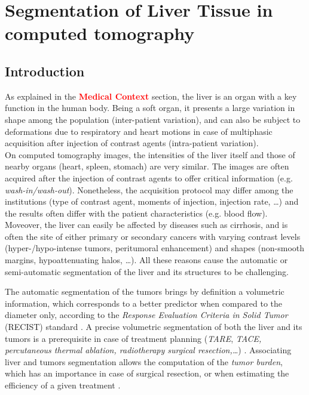 \documentclass[]{article}
\begin{document}
	
	\section*{Segmentation of Liver Tissue in computed tomography}
	
	\subsection*{Introduction}
	
	As explained in the \textbf{\textcolor{red}{Medical Context}} section, the liver is an
	organ with a key function in the human body. Being a soft organ, it
	presents a large variation in shape among the population (inter-patient
	variation), and can also be subject to deformations due to respiratory
	and heart motions in case of multiphasic acquisition after injection of
	contrast agents (intra-patient variation).\\
	On computed tomography images, the intensities of the liver itself and
	those of nearby organs (heart, spleen, stomach) are very similar. The
	images are often acquired after the injection of contrast agents to
	offer critical information (e.g. \emph{wash-in/wash-out}). Nonetheless,
	the acquisition protocol may differ among the institutions (type of
	contrast agent, moments of injection, injection rate, \ldots{}) and the
	results often differ with the patient characteristics (e.g. blood flow).
	Moveover, the liver can easily be affected by diseases such as
	cirrhosis, and is often the site of either primary or secondary cancers
	with varying contrast levels (hyper-/hypo-intense tumors, peritumoral
	enhancement) and shapes (non-smooth margins, hypoattenuating halos,
	\ldots{}). All these reasons cause the automatic or semi-automatic
	segmentation of the liver and its structures to be challenging.
	
	The automatic segmentation of the tumors brings by definition a
	volumetric information, which corresponds to a better predictor when
	compared to the diameter only, according to the \emph{Response
		Evaluation Criteria in Solid Tumor} (RECIST) standard \cite{Eisenhauer2008, Ye2017}. A precise
	volumetric segmentation of both the liver and its tumors is a
	prerequisite in case of treatment planning (\emph{TARE}, \emph{TACE,
		percutaneous thermal ablation, radiotherapy surgical resection,\ldots{}}) \cite{Al-Nahhas2014, Yamada1983, Albain2009, Rossi96}. Associating liver and tumors
	segmentation allows the computation of the \emph{tumor burden}, which
	has an importance in case of surgical resection, or when estimating the
	efficiency of a given treatment \cite{Nordlinger1996, Jagannath1986, Gobbi2004, Bauknecht2010, Bornemann2007, Heussel2007, Kuhnigk2006, Puesken2010}.
	
\end{document}
